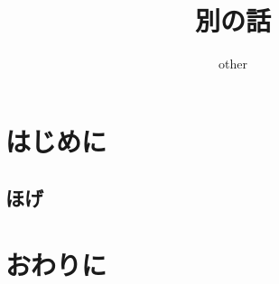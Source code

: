 \documentclass{subfiles}
\author{other}
\title{別の話}
\begin{document}
\maketitle
\section{はじめに}
\subsection{ほげ}
\section{おわりに}
\end{document}
